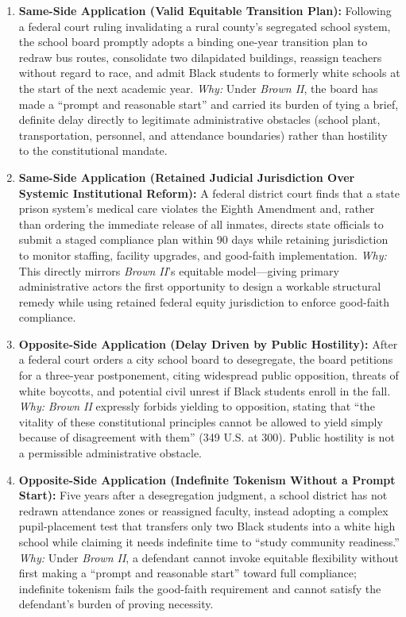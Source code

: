 \documentclass[12pt]{article}
\begin{document}
\begin{enumerate}
  \item \textbf{Same-Side Application (Valid Equitable Transition Plan):} Following a federal court ruling invalidating a rural county's segregated school system, the school board promptly adopts a binding one-year transition plan to redraw bus routes, consolidate two dilapidated buildings, reassign teachers without regard to race, and admit Black students to formerly white schools at the start of the next academic year. \textit{Why:} Under \textit{Brown II}, the board has made a ``prompt and reasonable start'' and carried its burden of tying a brief, definite delay directly to legitimate administrative obstacles (school plant, transportation, personnel, and attendance boundaries) rather than hostility to the constitutional mandate.

  \item \textbf{Same-Side Application (Retained Judicial Jurisdiction Over Systemic Institutional Reform):} A federal district court finds that a state prison system's medical care violates the Eighth Amendment and, rather than ordering the immediate release of all inmates, directs state officials to submit a staged compliance plan within 90 days while retaining jurisdiction to monitor staffing, facility upgrades, and good-faith implementation. \textit{Why:} This directly mirrors \textit{Brown II}'s equitable model---giving primary administrative actors the first opportunity to design a workable structural remedy while using retained federal equity jurisdiction to enforce good-faith compliance.

  \item \textbf{Opposite-Side Application (Delay Driven by Public Hostility):} After a federal court orders a city school board to desegregate, the board petitions for a three-year postponement, citing widespread public opposition, threats of white boycotts, and potential civil unrest if Black students enroll in the fall. \textit{Why:} \textit{Brown II} expressly forbids yielding to opposition, stating that ``the vitality of these constitutional principles cannot be allowed to yield simply because of disagreement with them'' (349 U.S. at 300). Public hostility is not a permissible administrative obstacle.

  \item \textbf{Opposite-Side Application (Indefinite Tokenism Without a Prompt Start):} Five years after a desegregation judgment, a school district has not redrawn attendance zones or reassigned faculty, instead adopting a complex pupil-placement test that transfers only two Black students into a white high school while claiming it needs indefinite time to ``study community readiness.'' \textit{Why:} Under \textit{Brown II}, a defendant cannot invoke equitable flexibility without first making a ``prompt and reasonable start'' toward full compliance; indefinite tokenism fails the good-faith requirement and cannot satisfy the defendant's burden of proving necessity.


\end{enumerate}
\end{document}
